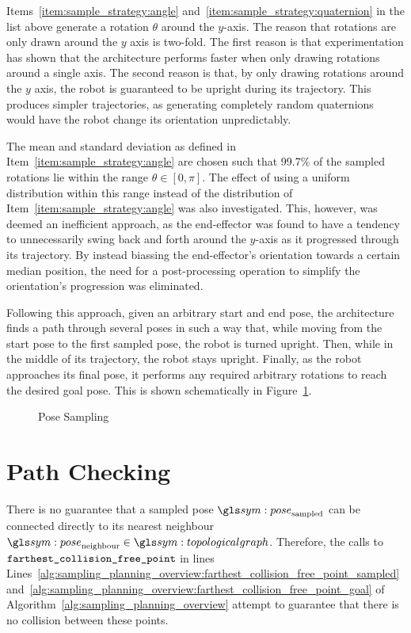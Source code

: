 			Items~\ref{item:sample_strategy:angle}
			and~\ref{item:sample_strategy:quaternion} in the list above generate
			a rotation $\theta$ around the $y$-axis. The reason that rotations
			are only drawn around the $y$ axis is two-fold. The first reason is
			that experimentation has shown that the architecture performs faster
			when only drawing rotations around a single axis. The second reason is that, by only drawing rotations
			around the $y$ axis, the robot is guaranteed to be upright during
			its trajectory. This produces simpler trajectories, as generating
			completely random quaternions would have the robot change its
			orientation unpredictably.

			The mean and standard deviation as defined in
			Item~\ref{item:sample_strategy:angle} are chosen such that 99.7\% of
			the sampled rotations lie within the range $\theta \in [0, \pi]$.
			The effect of using a uniform distribution within this range instead
			of the distribution of Item~\ref{item:sample_strategy:angle} was
			also investigated. This, however, was deemed an inefficient
			approach, as the end-effector was found to have a tendency to
			unnecessarily swing back and forth around the $y$-axis as it
			progressed through its trajectory. By instead biassing the
			end-effector's orientation towards a certain median position, the
			need for a post-processing operation to simplify the orientation's
			progression was eliminated.

			Following this approach, given an arbitrary start and end pose, the
			architecture finds a path through several poses in such a way that,
			while moving from the start pose to the first sampled pose, the
			robot is turned upright. Then, while in the middle of its
			trajectory, the robot stays upright. Finally, as the robot
			approaches its final pose, it performs any required arbitrary
			rotations to reach the desired goal pose. This is shown
			schematically in Figure~\ref{fig:pose_sampling}.

			\begin{figure}[hb]
				\missingfigure{}
				\caption{Pose Sampling}%
				\label{fig:pose_sampling}
			\end{figure}


	\section{Path Checking}%
	\label{sec:path_checking}

		\begin{sloppypar}

			There is no guarantee that a sampled pose $\pose_\text{sampled}$ can
			be connected directly to its nearest neighbour
			$\pose_\text{neighbour} \in \topologicalgraph$.  Therefore, the calls to
			$\texttt{farthest\_collision\_free\_point}$ in lines
			Lines~\ref{alg:sampling_planning_overview:farthest_collision_free_point_sampled}
			and~\ref{alg:sampling_planning_overview:farthest_collision_free_point_goal}
			of Algorithm~\ref{alg:sampling_planning_overview} attempt to
			guarantee that there is no collision between these points.

		\end{sloppypar}

